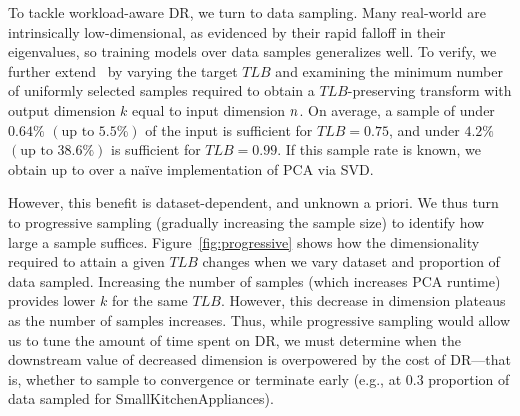 To tackle workload-aware DR, we turn to data sampling. 
Many real-world  are intrinsically low-dimensional, as evidenced by their rapid falloff in their eigenvalues, so training models over data samples generalizes well. 
To verify, we further extend~\cite{keogh-study} by varying the target $TLB$ and examining the minimum number of uniformly selected samples required to obtain a $TLB$-preserving transform with output dimension $k$ equal to input dimension ${\color{black}n}$.
On average, a sample of under $0.64\%$ $(\text{up to } 5.5\%)$ of the input is sufficient for $TLB = 0.75$, and under $4.2\%$ $(\text{up to } 38.6\%)$ is sufficient for $TLB=0.99$.  
If this sample rate is known, we obtain up to  over a na\"ive implementation of PCA via SVD.%

However, this benefit is dataset-dependent, and unknown a priori.
We thus turn to progressive sampling (gradually increasing the sample size) to identify how large a sample suffices.
Figure~\ref{fig:progressive} shows how the dimensionality required to attain a given $TLB$ changes when we vary dataset and proportion of data sampled.
Increasing the number of samples (which increases PCA runtime) provides lower $k$ for the same $TLB$.
However, this decrease in dimension plateaus as the number of samples increases.
Thus, while progressive sampling would allow us to tune the amount of time spent on DR, we must determine when the downstream value of decreased dimension is overpowered by the cost of DR---that is, whether to sample to convergence or terminate early (e.g., at $0.3$ proportion of data sampled for SmallKitchenAppliances). 






